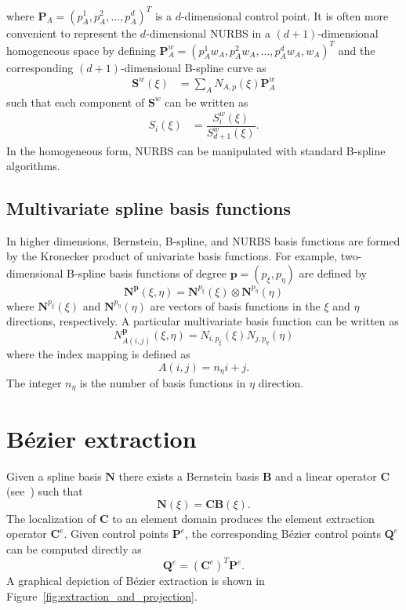 \documentclass{article}
\begin{document}
where $\mathbf{P}_A=(p_A^1,p_A^2,\ldots,p_A^d)^T$ is a $d$-dimensional control point. It is often more convenient to represent the $d$-dimensional NURBS in a $(d+1)$-dimensional homogeneous space by defining $\mathbf{P}_A^w=(p_A^1w_A,p_A^2w_A,\ldots,p_A^dw_A,w_A)^T$ and the corresponding $(d+1)$-dimensional B-spline curve as
\begin{align}
\mathbf{S}^w(\xi)&=\sum_A N_{A,p}(\xi)\mathbf{P}_A^w
\end{align}
such that each component of $\mathbf{S}^w$ can be written as
\begin{align}
S_i(\xi)&=\dfrac{{S}_i^w(\xi)}{{S}_{d+1}^w(\xi)}.
\end{align}
In the homogeneous form, NURBS can be manipulated with standard B-spline algorithms.

\subsection{Multivariate spline basis functions}
In higher dimensions, Bernstein, B-spline, and NURBS basis functions are formed by the Kronecker product of univariate basis functions. For example, two-dimensional B-spline basis functions of degree $\mathbf{p}=(p_\xi, p_\eta)$ are defined by
\begin{equation}
\mathbf{N}^\mathbf{p}(\xi,\eta)=\mathbf{N}^{p_\xi}(\xi)\otimes\mathbf{N}^{p_\eta}(\eta)
\end{equation}
where $\mathbf{N}^{p_\xi}(\xi)$ and $\mathbf{N}^{p_\eta}(\eta)$ are vectors of basis functions in the $\xi$ and $\eta$ directions, respectively. A particular multivariate basis function can be written as
\begin{equation}
{N}_{A(i,j)}^\mathbf{p}(\xi,\eta)={N}_{i,p_\xi}(\xi){N}_{j,p_\eta}(\eta)
\end{equation}
where the index mapping is defined as
\begin{equation}
A(i,j)=n_\eta{i}+j.
\end{equation}
The integer $n_\eta$ is the number of basis functions in $\eta$ direction.
\section{B\'{e}zier extraction}
\label{sec:extraction}
Given a spline basis $\mathbf{N}$ there exists a Bernstein basis $\mathbf{B}$ and a linear operator $\mathbf{C}$ (see~\cite{borden_isogeometric_2011}) such that
\begin{equation}
\mathbf{N}(\xi)=\mathbf{C}\mathbf{B}(\xi).
\end{equation}
The localization of $\mathbf{C}$ to an element domain produces the element extraction operator $\mathbf{C}^e$.
Given control points $\mathbf{P}^e$, the corresponding B\'ezier control points $\mathbf{Q}^e$ can be computed directly as
\begin{equation}
\mathbf{Q}^e=(\mathbf{C}^e)^T\mathbf{P}^e.
\end{equation}
A graphical depiction of B\'{e}zier extraction is shown in Figure~\ref{fig:extraction_and_projection}.
\end{document}
